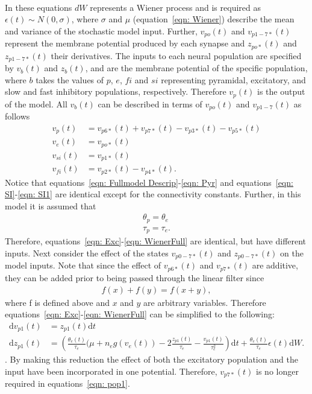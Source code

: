 \begin{align}
\end{align} In these equations $dW$ represents a Wiener process and is required as $\epsilon(t)\sim N(0,\sigma)$, where $\sigma$ and $\mu$ (equation~\ref{eqn: Wiener}) describe the mean and variance of the stochastic model input. Further, $v_{po}(t) $ and $v_{p1-7*}(t)$ represent the membrane potential produced by each synapse and $z_{po*}(t) $ and $z_{p1-7*}(t)$ their derivatives. The inputs to each neural population are specified by $v_{b}(t) $ and $z_{b}(t) $, and are the membrane potential of the specific population, where $b$ takes the values of $p$, $e$, $fi$ and $si$ representing pyramidal, excitatory, and slow and fast inhibitory populations, respectively. Therefore $v_{p}(t) $ is the output of the model. All $v_{b}(t) $ can be described in terms of $v_{po}(t)$ and $v_{p1-7}(t)$ as follows
\begin{align}
\label{eqn: pop1}
v_{p}(t) &= v_{p6*}(t)+v_{p7*}(t)-v_{p3*}(t)-v_{p5*}(t)\\
\label{eqn: pop2}
v_{e}(t) &= v_{po*}(t)\\
\label{eqn: pop3}
v_{si}(t) &= v_{p1*}(t)\\
\label{eqn: pop4}
v_{fi}(t) &= v_{p2*}(t)-v_{p4*}(t).
\end{align} Notice that equations~\ref{eqn: Fullmodel Descrip}-\ref{eqn: Pyr} and equations~\ref{eqn: SI}-\ref{eqn: SI1} are identical except for the connectivity constants. Further, in this model it is assumed that 
\begin{align}
\theta_p = \theta_e\\
\tau_p = \tau_e.
\end{align} Therefore, equations~\ref{eqn: Exc}-\ref{eqn: WienerFull} are identical, but have different inputs. Next consider the effect of the states $v_{p0-7*}(t)$ and $z_{p0-7*}(t)$ on the model inputs. Note that since the effect of $v_{p6*}(t)$ and $v_{p7*}(t)$ are additive, they can be added prior to being passed through the linear filter since
\begin{align}
f(x) + f(y) = f(x+y),
\end{align} where f is defined above and $x$ and $y$ are arbitrary variables. Therefore equations~\ref{eqn: Exc}-\ref{eqn: WienerFull} can be simplified to the following:
\begin{align}
\mathrm{d}v_{p1}(t)&= z_{p1}(t)\mathrm{d}t\\
\label{eqn: Wiener1}
\mathrm{d}z_{p1}(t)&=\left(\frac{\theta_{e}(t)}{\tau_{e}}(\mu +n_{e}g(v_{e}(t))-2\frac{z_{p1}(t)}{\tau_{e}}-\frac{v_{p1}(t)}{\tau_{e}^{2}}\right)\mathrm{d}t + \frac{\theta_{e}(t)}{\tau_{e}}\epsilon(t)\mathrm{d}W.
\end{align}. By making this reduction the effect of both the excitatory population and the input have been incorporated in one potential. Therefore, $v_{p7*}(t)$ is no longer required in equations~\ref{eqn: pop1}. 

